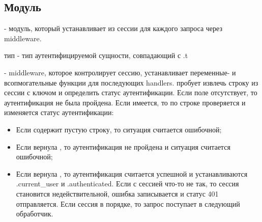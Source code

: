 \subsection{Модуль }\label{page-FPauth-core-module-FPauth+u+core-module-Make+u+Auth-module-Session+u+manager}%
 - модуль, который устанавливает  из сессии для каждого запроса через \hyperref[page-FPauth-core-module-FPauth+u+core-module-Auth+u+sign-module-type-SESSIONMANAGER-val-auth+u+setup]{} middleware.

\label{page-FPauth-core-module-FPauth+u+core-module-Make+u+Auth-module-Session+u+manager-type-entity}\begin{ocamlindent}тип  - тип аутентифицируемой сущности, совпадающий с .t\end{ocamlindent}%
\medbreak
\label{page-FPauth-core-module-FPauth+u+core-module-Make+u+Auth-module-Session+u+manager-val-auth+u+setup}\begin{ocamlindent} - middleware, которое контролирует сессию, устанавливает переменные- и всопмогательные функции для последующих handlers. пробует извлечь строку из сессии с ключом  и определить статус аутентификации. Если поле  отсутствует, то аутентификация не была пройдена. Если  имеется, то по строке проверяется и изменяется статус аутентификации:\begin{itemize}\item{Если  содержит пустую строку, то ситуация считается ошибочной;}%
\item{Если \hyperref[page-FPauth-core-module-FPauth+u+core-module-Make+u+Auth-argument-1-M-val-deserialize]{} вернула , то аутентификация не пройдена и ситуация считается ошибочной;}%
\item{Если \hyperref[page-FPauth-core-module-FPauth+u+core-module-Make+u+Auth-argument-1-M-val-deserialize]{} вернула , то аутентификация считается успешной и устанавливаются .current\_user и .authenticated. Если с сессией что-то не так, то сессия становится недействительной, ошибка записывается и статус 401 отправляется. Если сессия в порядке, то запрос поступает в следующий обработчик.}\end{itemize}%
\end{ocamlindent}%
\medbreak


